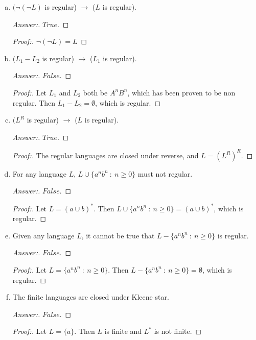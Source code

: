 \documentclass[10pt]{article}
\begin{document}
\begin{enumerate}[1)]
\begin{enumerate}[a)]
\item
$(\lnot (\lnot L)$ is regular) $\rightarrow$ ($L$ is regular).
\begin{proof}[Answer:]
$True$.
\end{proof}
\begin{proof}[Proof:]
$\lnot (\lnot L) = L$
\end{proof}

\item
$(L_1 - L_2$ is regular) $\rightarrow$ ($L_1$ is regular).
\begin{proof}[Answer:]
$False$.
\end{proof}
\begin{proof}[Proof:]
Let $L_1$ and $L_2$ both be $A^nB^n$, which has been proven to be non regular.  Then $L_1 - L_2 = \emptyset$, which is regular.
\end{proof}

\item
$(L^R$ is regular) $\rightarrow$ ($L$ is regular).
\begin{proof}[Answer:]
$True$.
\end{proof}
\begin{proof}[Proof:]
The regular languages are closed under reverse, and $L = (L^R)^R$.
\end{proof}

\item
For any language $L$, $L \cup \{a^nb^n\ :\ n \geq 0\}$ must not regular.
\begin{proof}[Answer:]
$False$.
\end{proof}
\begin{proof}[Proof:]
Let $L = (a \cup b)^*$.  Then $L \cup \{a^nb^n\ :\ n \geq 0\} = (a \cup b)^*$, which is regular.
\end{proof}

\item
Given any language $L$, it cannot be true that $L - \{a^nb^n\ :\ n \geq 0\}$ is regular.
\begin{proof}[Answer:]
$False$.
\end{proof}
\begin{proof}[Proof:]
Let $L = \{a^nb^n\ :\ n \geq 0\}$.  Then $L - \{a^nb^n\ :\ n \geq 0\} = \emptyset$, which is regular.
\end{proof}

\item
The finite languages are closed under Kleene star.
\begin{proof}[Answer:]
$False$.
\end{proof}
\begin{proof}[Proof:]
Let $L = \{a\}$.  Then $L$ is finite and $L^*$ is not finite. 
\end{proof}
\end{enumerate}
\end{enumerate}
\end{document}
